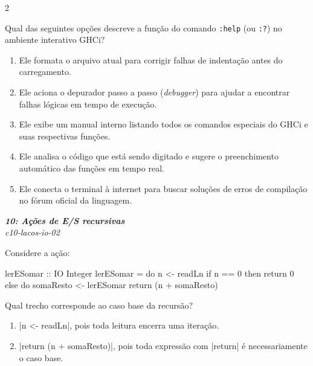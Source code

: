 \documentclass[a4paper,10pt,brazil]{article}
\begin{document}
\begin{multicols}{2}
\begin{flushright}
\end{flushright}
Qual das seguintes opções descreve a função do comando \texttt{:help} (ou \texttt{:?}) no ambiente interativo GHCi?

\begin{enumerate}
  \item Ele formata o arquivo atual para corrigir falhas de indentação antes do carregamento.

  \item Ele aciona o depurador passo a passo (\emph{debugger}) para ajudar a encontrar falhas lógicas em tempo de execução.

  \item Ele exibe um manual interno listando todos os comandos especiais do GHCi e suas respectivas funções.

  \item Ele analisa o código que está sendo digitado e sugere o preenchimento automático das funções em tempo real.

  \item Ele conecta o terminal à internet para buscar soluções de erros de compilação no fórum oficial da linguagem.


\end{enumerate}

\begin{flushright}
  \footnotesize
  \textit{\textbf{10: Ações de E/S recursivas}}\\
  \textit{c10-lacos-io-02}\\

\end{flushright}
Considere a ação:

\begin{haskellcode}
lerESomar :: IO Integer
lerESomar = do
  n <- readLn
  if n == 0
    then return 0
    else do
      somaResto <- lerESomar
      return (n + somaResto)
\end{haskellcode}

Qual trecho corresponde ao caso base da recursão?

\begin{enumerate}
  \item \haskellinline|n <- readLn|, pois toda leitura encerra uma iteração.

  \item \haskellinline|return (n + somaResto)|, pois toda expressão com \haskellinline|return| é necessariamente o caso base.


\end{enumerate}
\end{multicols}
\end{document}
